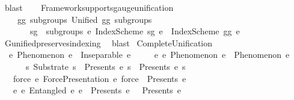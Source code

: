 \begin{isabellebody}
\ blast%
\endisatagproof
{\isafoldproof}%
%
\isadelimproof
\isanewline
%
\endisadelimproof
\isanewline
\ \ \isamarkupfalse%
\ Framework{\isacharunderscore}{\kern0pt}supports{\isacharunderscore}{\kern0pt}gauge{\isacharunderscore}{\kern0pt}unification{\isacharcolon}{\kern0pt}\isanewline
\ \ \ \ {\isachardoublequoteopen}{\isasymforall}gg\ subgroups{\isachardot}{\kern0pt}\ Unified\ gg\ subgroups\ {\isasymlongrightarrow}\isanewline
\ \ \ \ \ \ \ {\isacharparenleft}{\kern0pt}{\isasymforall}sg\ {\isasymin}\ subgroups{\isachardot}{\kern0pt}\ {\isasymforall}e{\isachardot}{\kern0pt}\ IndexScheme\ sg\ e\ {\isasymlongrightarrow}\ IndexScheme\ gg\ e{\isacharparenright}{\kern0pt}{\isachardoublequoteclose}\isanewline
%
\isadelimproof
\ \ \ \ %
\endisadelimproof
%
\isatagproof
{}\isamarkupfalse%
\ G{}{\isacharunderscore}{\kern0pt}unified{\isacharunderscore}{\kern0pt}preserves{\isacharunderscore}{\kern0pt}indexing\ \isamarkupfalse%
\ blast%
\endisatagproof
{\isafoldproof}%
%
\isadelimproof
%
\endisadelimproof
%
\isadelimdocument
%
\endisadelimdocument
%
\isatagdocument
%
\isamarkuptrue%
%
\endisatagdocument
{\isafolddocument}%
%
\isadelimdocument
%
\endisadelimdocument
{}\isamarkupfalse%
\ Complete{\isacharunderscore}{\kern0pt}Unification{\isacharcolon}{\kern0pt}\isanewline
\ \ {\isachardoublequoteopen}{\isacharparenleft}{\kern0pt}{\isasymforall}e{\isachardot}{\kern0pt}\ Phenomenon\ e\ {\isasymlongrightarrow}\ Inseparable\ e\ {\isasymOmega}{\isacharparenright}{\kern0pt}\ {\isasymand}\isanewline
\ \ \ {\isacharparenleft}{\kern0pt}{\isasymforall}e{}\ e{}{\isachardot}{\kern0pt}\ Phenomenon\ e{}\ {\isasymand}\ Phenomenon\ e{}\ {\isasymlongrightarrow}\isanewline
\ \ \ \ \ \ {\isacharparenleft}{\kern0pt}{\isasymexists}s{\isachardot}{\kern0pt}\ Substrate\ s\ {\isasymand}\ Presents\ e{}\ s\ {\isasymand}\ Presents\ e{}\ s{\isacharparenright}{\kern0pt}{\isacharparenright}{\kern0pt}\ {\isasymand}\isanewline
\ \ \ {\isacharparenleft}{\kern0pt}{\isasymforall}force\ e{\isachardot}{\kern0pt}\ ForcePresentation\ e\ force\ {\isasymlongrightarrow}\ Presents\ e\ {\isasymOmega}{\isacharparenright}{\kern0pt}\ {\isasymand}\isanewline
\ \ \ {\isacharparenleft}{\kern0pt}{\isasymforall}e{}\ e{}{\isachardot}{\kern0pt}\ Entangled\ e{}\ e{}\ {\isasymlongrightarrow}\ Presents\ e{}\ {\isasymOmega}\ {\isasymand}\ Presents\ e{}\ {\isasymOmega}{\isacharparenright}{\kern0pt}\ {\isasymand}\isanewline

\end{isabellebody}
